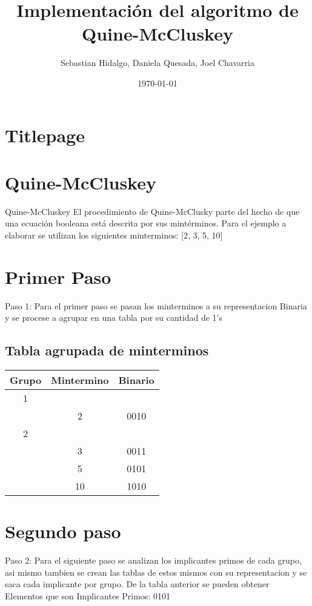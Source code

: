 \documentclass{beamer}%
\title{Implementación del algoritmo de Quine{-}McCluskey}%
\author{Sebastian Hidalgo, Daniela Quesada, Joel Chavarria}%
\date{\today}%
\begin{document}
%
\normalsize%
\section{Titlepage}%
\label{sec:Titlepage}%
\maketitle

%
\newpage%
\section{Quine{-}McCluskey}%
\label{sec:Quine{-}McCluskey}%
Quine{-}McCluskey%
\newline%
\newline%
El procedimiento de Quine{-}McClusky parte del hecho de que una ecuación booleana está descrita por sus mintérminos.%
\newline%
\newline%
Para el ejemplo a elaborar se utilizan los siguientes minterminos: %
{[}2, 3, 5, 10{]}

%
\newpage%
\section{Primer Paso}%
\label{sec:PrimerPaso}%
Paso 1: %
\newline%
Para el primer paso se pasan los minterminos a su representacion Binaria y se procese a agrupar en una tabla por su cantidad de 1's%
\newline%
\newline%
\newline%
%
\subsection{Tabla agrupada de minterminos}%
\label{subsec:Tablaagrupadademinterminos}%
\begin{tabular}{| c | c | c |}%
\hline%
Grupo&Mintermino&Binario\\%
\hline%
1&&\\%
&2&0010\\%
\hline%
2&&\\%
&3&0011\\%
&5&0101\\%
&10&1010\\%
\hline%
\hline%
\end{tabular}

%
\newpage%
\section{Segundo paso}%
\label{sec:Segundopaso}%
Paso 2:%
\newline%
Para el siguiente paso se analizan los implicantes primos de cada grupo, asi mismo tambien se crean las tablas de estos mismos con su representacion y se saca cada implicante por grupo.\newline%
\newline%
%
De la tabla anterior se pueden obtener Elementos que son Implicantes Primos: 0101%
\newline%
\newline%
%
\end{document}
